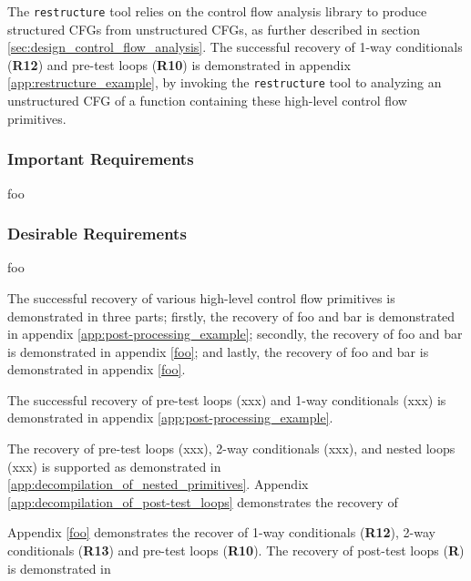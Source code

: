 The \texttt{restructure} tool relies on the control flow analysis library to produce structured CFGs from unstructured CFGs, as further described in section \ref{sec:design_control_flow_analysis}. The successful recovery of 1-way conditionals (\textbf{R12}) and pre-test loops (\textbf{R10}) is demonstrated in appendix \ref{app:restructure_example}, by invoking the \texttt{restructure} tool to analyzing an unstructured CFG of a function containing these high-level control flow primitives.


\subsubsection{Important Requirements}
\label{sec:eval_control_flow_analysis_library_important_requirements}

foo


\subsubsection{Desirable Requirements}
\label{sec:eval_control_flow_analysis_library_desirable_requirements}

foo



The successful recovery of various high-level control flow primitives is demonstrated in three parts; firstly, the recovery of foo and bar is demonstrated in appendix \ref{app:post-processing_example}; secondly, the recovery of foo and bar is demonstrated in appendix \ref{foo}; and lastly, the recovery of foo and bar is demonstrated in appendix \ref{foo}.

The successful recovery of pre-test loops (xxx) and 1-way conditionals (xxx) is demonstrated in appendix \ref{app:post-processing_example}.


The recovery of pre-test loops (xxx), 2-way conditionals (xxx), and nested loops (xxx) is supported as demonstrated in \ref{app:decompilation_of_nested_primitives}. Appendix \ref{app:decompilation_of_post-test_loops} demonstrates the recovery of

Appendix \ref{foo} demonstrates the recover of 1-way conditionals (\textbf{R12}), 2-way conditionals (\textbf{R13}) and pre-test loops (\textbf{R10}). The recovery of post-test loops (\textbf{R}) is demonstrated in


